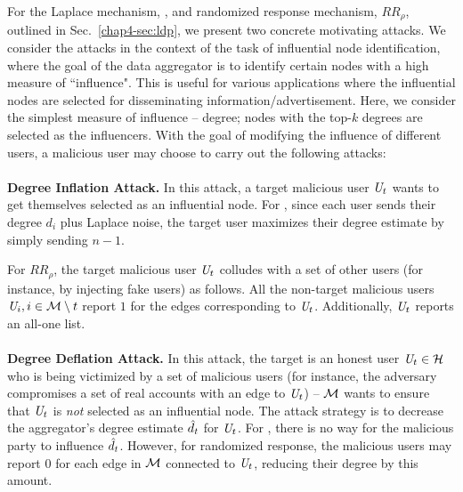 For the Laplace mechanism, \RLap, and randomized response mechanism, $RR_\rho$,  outlined in Sec.~\ref{chap4-sec:ldp}, we present two concrete motivating attacks. We consider the attacks in the context of the task of influential node identification, where the goal of the data aggregator is to identify certain nodes with a high measure of ``influence". This is useful for various applications where the influential nodes are selected for disseminating information/advertisement. Here, we consider the simplest measure of influence -- degree; nodes with the top-$k$ degrees are selected as the influencers. With the goal of modifying the influence of different users, a malicious user may choose to carry out the following attacks:
  \vspace{-0.2cm}  \\\\\noindent\textbf{Degree Inflation Attack.} In this attack, a target malicious user $\textit{U}_t$ wants to get themselves selected as an influential node. For \RLap, since each user sends their degree $d_i$ plus Laplace noise, the target user maximizes their degree estimate by simply sending $n-1$. 

For $RR_\rho$, the target malicious user $\textit{U}_t$ colludes with a set of other users  (for instance, by injecting fake users) as follows. All the non-target malicious users $\textit{U}_i, i \in \mathcal{M}\setminus t$ report $1$ for the edges corresponding to $\textit{U}_t$. Additionally, $\textit{U}_t$ reports an all-one list.   \vspace{-0.2cm}  \\\\
\noindent\textbf{Degree Deflation Attack.}   In this attack, the target is an honest user $\textit{U}_t \in \mathcal{H}$ who is being victimized by a set of malicious users (for instance, the adversary compromises a set of real accounts with an edge to $\textit{U}_t$) -- $\mathcal{M}$ wants to ensure that $\textit{U}_t$ is \textit{not} selected as an influential node. The attack strategy is to decrease the aggregator's degree estimate $\hat{d}_t$ for $\textit{U}_t$. For \RLap, there is no way for the malicious party to influence $\hat{d}_t$. However, for randomized response, the malicious users may report $0$ for each edge in $\mathcal{M}$ connected to $\textit{U}_t$, reducing their degree by this amount. %
